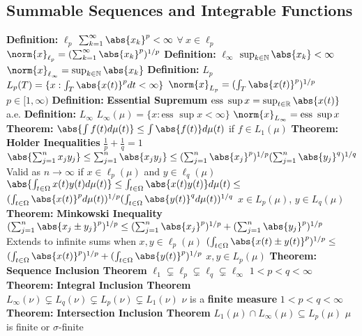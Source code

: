 \documentclass[14pt]{extarticle}
\def\Definition{{\color{blue} \textbf{Definition:} }}
\def\Theorem{{\color{red} \textbf{Theorem:} }}
\begin{document}
\begin{outline}
	\section*{Summable Sequences and Integrable Functions}
		\1	\Definition $\ell_p$
			\2	$\sum_{k=1}^{\infty} \abs{x_k}^p < \infty$ $\forall~x \in \ell_p$
			\2	$\norm{x}_{\ell_p} = (\sum_{k=1}^{\infty} \abs{x_k}^p)^{1/p}$
		\1	\Definition $\ell_{\infty}$
			\2	$\sup_{k \in \mathbb{N}} \abs{x_k} < \infty$
			\2	$\norm{x}_{\ell_{\infty}} = \sup_{k \in \mathbb{N}} \abs{x_k}$
		\1	\Definition $L_p$ 
			\2	$L_p(T) = \{x : \int_T \abs{x(t)}^p dt < \infty\}$
			\2	$\norm{x}_{L_p} = (\int_T \abs{x(t)}^p)^{1/p}$
			\2	$p \in [1,\infty)$
		\1	\Definition \textbf{Essential Supremum}
			\2	$\text{ess } \sup x = \sup_{t \in \mathbb{R}} \abs{x(t)}$ a.e.
		\1	\Definition $L_{\infty}$
			\2	$L_{\infty}(\mu) = \{x : \text{ess } \sup x < \infty\}$
			\2	$\norm{x}_{L_{\infty}} = \text{ess } \sup x$
		\1	\Theorem $\abs{\int f(t) d\mu(t)} \le \int \abs{f(t)} d\mu(t)$ if $f \in L_1(\mu)$
		\1	\Theorem \textbf{Holder Inequalities}
			\2	$\frac{1}{p} + \frac{1}{q} = 1$
			\2	$\abs{\sum_{j=1}^n x_jy_j} \le \sum_{j=1}^n\abs{x_jy_j} \le (\sum_{j=1}^n\abs{x_j}^p)^{1/p}
					(\sum_{j=1}^n\abs{y_j}^q)^{1/q}$
				\3	Valid as $n \rightarrow \infty$ if $x \in \ell_p(\mu)$ and $y \in \ell_q(\mu)$
			\2	$\abs{\int_{t \in \Omega} x(t)y(t) d\mu(t)} \le 
				\int_{t \in \Omega}\abs{x(t)y(t)}d\mu(t) \le$
			\2 $(\int_{t \in \Omega} \abs{x(t)}^pd\mu(t))^{1/p}(\int_{t \in \Omega}\abs{y(t)}^qd\mu(t))^{1/q}$
				\3	$x \in L_p(\mu)$, $y \in L_q(\mu)$
		\1	\Theorem \textbf{Minkowski Inequality}
			\2	$(\sum_{j=1}^n \abs{x_j \pm y_j}^p)^{1/p} \le (\sum_{j=1}^n \abs{x_j}^p)^{1/p}
				+ (\sum_{j=1}^n \abs{y_j}^p)^{1/p}$
				\3	Extends to infinite sums when $x,y \in \ell_p(\mu)$
			\2	$(\int_{t\in\Omega}\abs{x(t) \pm y(t)}^p)^{1/p} \le $
			\2	$(\int_{t \in \Omega}\abs{x(t)}^p)^{1/p} + (\int_{t \in \Omega} \abs{y(t)}^p)^{1/p}$
				\3	$x,y \in L_p(\mu)$
		\1	\Theorem \textbf{Sequence Inclusion Theorem}
			\2	$\ell_1 \subsetneq \ell_p \subsetneq \ell_q \subsetneq \ell_{\infty}$
				\3	$1 < p < q < \infty$
		\1	\Theorem \textbf{Integral Inclusion Theorem}
			\2	$L_{\infty}(\nu) \subsetneq L_q(\nu) \subsetneq L_p(\nu) \subsetneq L_1(\nu)$
				\3	$\nu$ is a \textbf{finite measure}
				\3	$1 < p < q < \infty$
		\1	\Theorem \textbf{Intersection Inclusion Theorem}
			\2	$L_1(\mu) \cap L_{\infty}(\mu) \subseteq L_p(\mu)$ 
				\3	$\mu$ is finite or $\sigma$-finite

\end{outline}
\end{document}
